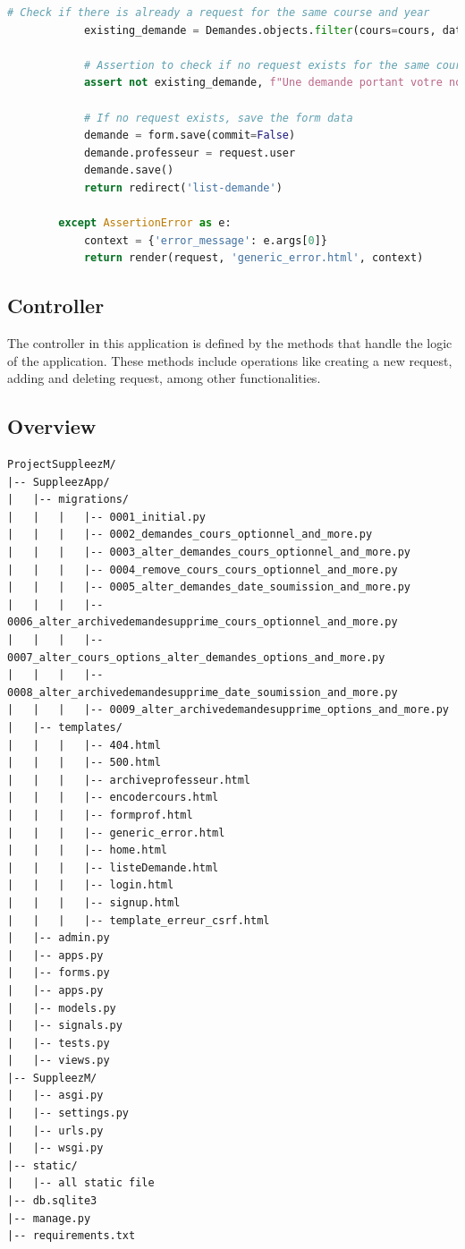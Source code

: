 \documentclass[12pt]{article}
\begin{document}
\begin{lstlisting}[language=Python]
            # Check if there is already a request for the same course and year
            existing_demande = Demandes.objects.filter(cours=cours, date_soumission__year=year, professeur=prof).first()

            # Assertion to check if no request exists for the same course and year
            assert not existing_demande, f"Une demande portant votre nom comme professeur titulaire pour ce cours existe déjà cette année {year}. Si elle n'a pas été soumise par vous, veuillez contacter l'administration."

            # If no request exists, save the form data
            demande = form.save(commit=False)
            demande.professeur = request.user
            demande.save()
            return redirect('list-demande')

        except AssertionError as e:
            context = {'error_message': e.args[0]}
            return render(request, 'generic_error.html', context)
\end{lstlisting}

\subsection{Controller}
The controller in this application is defined by the methods that handle the logic of the application. These methods include operations like creating a new request, adding and deleting request, among other functionalities.

            
\newpage{}

\subsection{Overview}
\begin{verbatim}
ProjectSuppleezM/
|-- SuppleezApp/
|   |-- migrations/
|   |   |   |-- 0001_initial.py
|   |   |   |-- 0002_demandes_cours_optionnel_and_more.py
|   |   |   |-- 0003_alter_demandes_cours_optionnel_and_more.py
|   |   |   |-- 0004_remove_cours_cours_optionnel_and_more.py
|   |   |   |-- 0005_alter_demandes_date_soumission_and_more.py
|   |   |   |-- 0006_alter_archivedemandesupprime_cours_optionnel_and_more.py
|   |   |   |-- 0007_alter_cours_options_alter_demandes_options_and_more.py
|   |   |   |-- 0008_alter_archivedemandesupprime_date_soumission_and_more.py
|   |   |   |-- 0009_alter_archivedemandesupprime_options_and_more.py
|   |-- templates/
|   |   |   |-- 404.html
|   |   |   |-- 500.html
|   |   |   |-- archiveprofesseur.html
|   |   |   |-- encodercours.html
|   |   |   |-- formprof.html
|   |   |   |-- generic_error.html
|   |   |   |-- home.html
|   |   |   |-- listeDemande.html
|   |   |   |-- login.html
|   |   |   |-- signup.html
|   |   |   |-- template_erreur_csrf.html
|   |-- admin.py
|   |-- apps.py
|   |-- forms.py
|   |-- apps.py
|   |-- models.py
|   |-- signals.py
|   |-- tests.py
|   |-- views.py
|-- SuppleezM/
|   |-- asgi.py
|   |-- settings.py
|   |-- urls.py
|   |-- wsgi.py
|-- static/
|   |-- all static file
|-- db.sqlite3
|-- manage.py
|-- requirements.txt

\end{verbatim}
\end{document}
